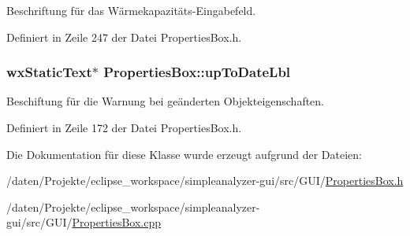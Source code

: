 Beschriftung für das Wärmekapazitäts-\/\-Eingabefeld. 



Definiert in Zeile 247 der Datei Properties\-Box.\-h.

\hypertarget{classPropertiesBox_acd0a5ccaa4e981b961685c5714e67f92}{
\subsubsection[{up\-To\-Date\-Lbl}]{\setlength{\rightskip}{0pt plus 5cm}wx\-Static\-Text$\ast$ Properties\-Box\-::up\-To\-Date\-Lbl\hspace{0.3cm}{\ttfamily [private]}}}\label{classPropertiesBox_acd0a5ccaa4e981b961685c5714e67f92}


Beschiftung für die Warnung bei geänderten Objekteigenschaften. 



Definiert in Zeile 172 der Datei Properties\-Box.\-h.



Die Dokumentation für diese Klasse wurde erzeugt aufgrund der Dateien\-:\begin{DoxyCompactItemize}
\item 
/daten/\-Projekte/eclipse\-\_\-workspace/simpleanalyzer-\/gui/src/\-G\-U\-I/\hyperlink{PropertiesBox_8h}{Properties\-Box.\-h}\item 
/daten/\-Projekte/eclipse\-\_\-workspace/simpleanalyzer-\/gui/src/\-G\-U\-I/\hyperlink{PropertiesBox_8cpp}{Properties\-Box.\-cpp}\end{DoxyCompactItemize}
